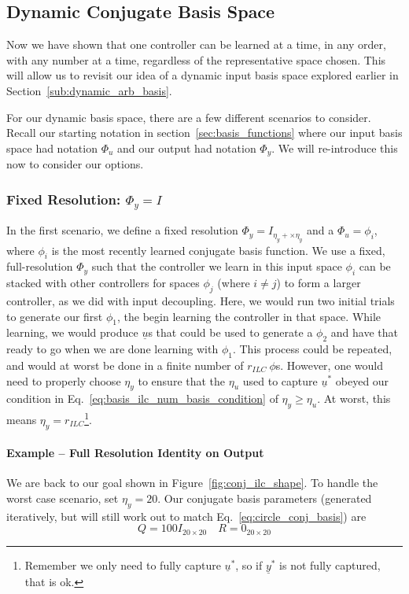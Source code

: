\FloatBarrier\subsection{Dynamic Conjugate Basis Space}
Now we have shown that one controller can be learned at a time, in any order, with any number at a time, regardless of the representative space chosen. This will allow us to revisit our idea of a dynamic input basis space explored earlier in Section~\ref{sub:dynamic_arb_basis}.

For our dynamic basis space, there are a few different scenarios to consider. Recall our starting notation in section~\ref{sec:basis_functions} where our input basis space had notation $\Phi_u$ and our output had notation $\Phi_y$. We will re-introduce this now to consider our options.

\FloatBarrier\subsubsection{Fixed Resolution: $\Phi_y = I$}
In the first scenario, we define a fixed resolution $\Phi_y = I_{\eta_y + \times \eta_y}$ and a $\Phi_u = \phi_i$, where $\phi_i$ is the most recently learned conjugate basis function. 
We use a fixed, full-resolution $\Phi_y$ such that the controller we learn in this input space $\phi_i$ can be stacked with other controllers for spaces $\phi_j$ (where $i \neq j$) to form a larger controller, as we did with input decoupling. 
Here, we would run two initial trials to generate our first $\phi_1$, the begin learning the controller in that space. While learning, we would produce $\underline{u}$s that could be used to generate a $\phi_2$ and have that ready to go when we are done learning with $\phi_1$. 
This process could be repeated, and would at worst be done in a finite number of $r_{ILC} \ \phi$s. However, one would need to properly choose $\eta_y$ to ensure that the $\eta_u$ used to capture $\underline{u}^\ast$ obeyed our condition in Eq.~\ref{eq:basis_ilc_num_basis_condition} of $\eta_y \geq \eta_u$. At worst, this means $\eta_y = r_{ILC}$\footnote{Remember we only need to fully capture $\underline{u}^\ast$, so if $\underline{y}^\ast$ is not fully captured, that is ok.}.

\FloatBarrier\paragraph{Example -- Full Resolution Identity on Output}
We are back to our goal shown in Figure~\ref{fig:conj_ilc_shape}. To handle the worst case scenario, set $\eta_y = 20$. Our conjugate basis parameters (generated iteratively, but will still work out to match Eq.~\ref{eq:circle_conj_basis}) are
\begin{equation}
    Q = 100I_{20 \times 20}
    \quad
    R = 0_{20 \times 20}
\end{equation}

